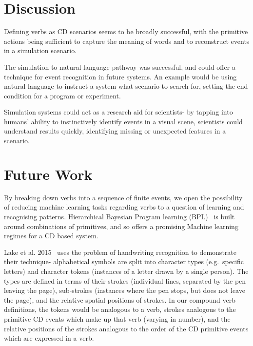 \documentclass[12pt,MSc,wordcount,twoside]{muthesis}
\begin{document}

    \chapter{Discussion}
    Defining verbs as CD scenarios seems to be broadly successful, with the primitive actions being sufficient to capture the meaning of words and to reconstruct events in a simulation scenario.

    The simulation to natural language pathway was successful, and could offer a technique for event recognition in future systems. An example would be using natural language to instruct a system what scenario to search for, setting the end condition for a program or experiment.

    Simulation systems could act as a research aid for scientists- by tapping into humans' ability to instinctively identify events in a visual scene, scientists could understand results quickly, identifying missing or unexpected features in a scenario.

    \chapter{Future Work}
    By breaking down verbs into a sequence of finite events, we open the possibility of reducing machine learning tasks regarding verbs to a question of learning and recognising patterns. Hierarchical Bayesian Program learning (BPL)~\cite{one-shot-learning} is built around combinations of primitives, and so offers a promising Machine learning regimes for a CD based system.

    Lake et al. 2015~\cite{one-shot-learning} uses the problem of handwriting recognition to demonstrate their technique- alphabetical symbols are split into character types (e.g.~specific letters) and character tokens (instances of a letter drawn by a single person). The types are defined in terms of their strokes (individual lines, separated by the pen leaving the page), sub-strokes (instances where the pen stops, but does not leave the page), and the relative spatial positions of strokes. In our compound verb definitions, the tokens would be analogous to a verb, strokes analogous to the primitive CD events which make up that verb (varying in number), and the relative positions of the strokes analogous to the order of the CD primitive events which are expressed in a verb.
    
\end{document}
